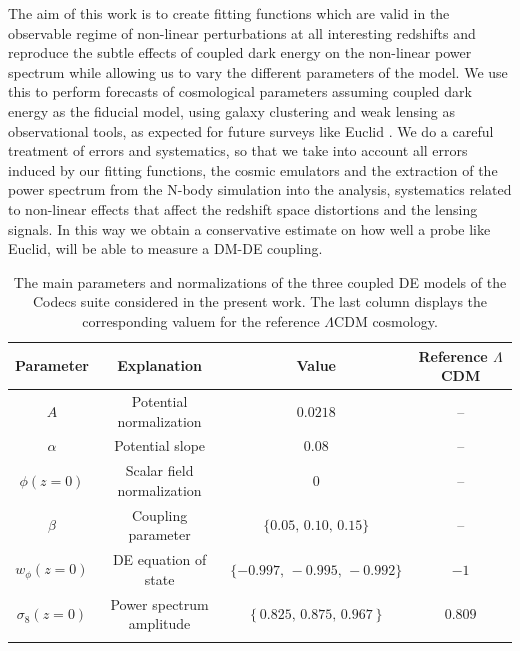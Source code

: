 The aim of this work is to create fitting functions which are valid
in the observable regime of non-linear perturbations at all interesting
redshifts and reproduce the subtle effects of coupled dark energy
on the non-linear power spectrum while allowing us to vary the different
parameters of the model. We use this to perform forecasts of cosmological
parameters assuming coupled dark energy as the fiducial model, using
galaxy clustering and weak lensing as observational tools, as expected
for future surveys like Euclid \cite{laureijs_euclid_2011,amendola_cosmology_2012-short}.
We do a careful treatment of errors and systematics, so that we take
into account all errors induced by our fitting functions, the cosmic
emulators and the extraction of the power spectrum from the N-body
simulation into the analysis, systematics related to non-linear effects
that affect the redshift space distortions and the lensing signals.
In this way we obtain a conservative estimate on how well a probe
like Euclid, will be able to measure a DM-DE coupling.


%



\begin{table}
\footnotesize
\centering{}\label{tab:models} %
\begin{tabular}{ccc|c}
\textbf{Parameter}  & \textbf{Explanation}  & \textbf{Value}  & \textbf{Reference $\Lambda$CDM}\tabularnewline
\hline 
\hline 
$A$  & Potential normalization  & $0.0218$  & -- \tabularnewline
$\alpha$  & Potential slope  & $0.08$  & -- \tabularnewline
$\phi(z=0)$  & Scalar field normalization  & $0$  & -- \tabularnewline
$\beta$  & Coupling parameter  & $\{0.05,\,0.10,\,0.15\}$  & -- \tabularnewline
$w_{\phi}(z=0)$  & DE equation of state  & $\{-0.997,\,-0.995,\,-0.992\}$  & $-1$ \tabularnewline
$\sigma_{8}(z=0)$  & Power spectrum amplitude  & $\left\{ 0.825,\,0.875,\,0.967\right\} $  & $0.809$ \tabularnewline
\hline 
\small
\end{tabular}
\caption[Parameters of the coupled DE models with constant coupling.]{\label{tab:normalization-conventions-codecs} The main parameters
and normalizations of the three coupled DE models of the Codecs
suite considered in the present work. The last column displays the
corresponding valuem for the reference $\Lambda$CDM cosmology.}
\end{table}
\normalsize


